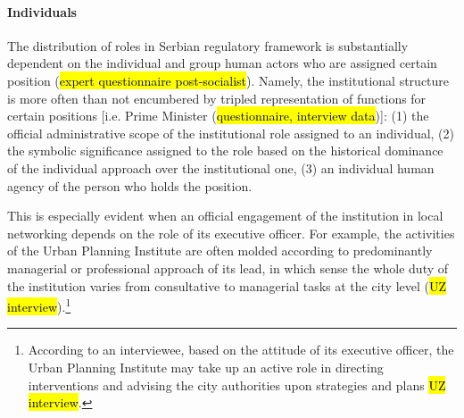 \documentclass[11pt]{report}
\begin{document}
\paragraph{Individuals}
The distribution of roles in Serbian regulatory framework is substantially dependent on the individual and group human actors who are assigned certain position (\hl{expert questionnaire post-socialist}). Namely, the institutional structure is more often than not encumbered by tripled representation of functions for certain positions [i.e. Prime Minister (\hl{questionnaire, interview data})]:
(1) the official administrative scope of the institutional role assigned to an individual,
(2) the symbolic significance assigned to the role based on the historical dominance of the individual approach over the institutional one,
(3) an individual human agency of the person who holds the position.

This is especially evident when an official engagement of the institution in local networking depends on the role of its executive officer.
For example, the activities of the Urban Planning Institute are often molded according to predominantly managerial or professional approach of its lead, in which sense the whole duty of the institution varies from consultative to managerial tasks at the city level (\hl{UZ interview}).\footnote{
According to an interviewee, based on the attitude of its executive officer, the Urban Planning Institute may take up an active role in directing interventions and advising the city authorities upon strategies and plans \hl{UZ interview}.}
\end{document}
